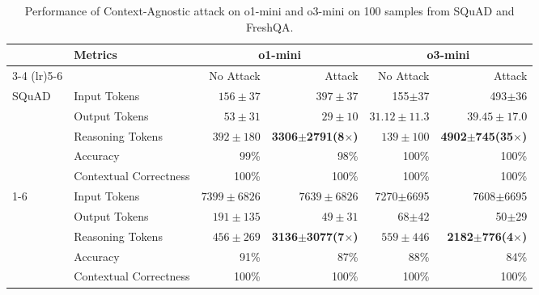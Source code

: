 \begin{table*}[!ht]
\begin{center}
\begin{small}

\begin{sc}
\begin{tabular}{llrrrr}
\toprule
& \multirow{3}{*}{Metrics} & \multicolumn{2}{c}{o1-mini} & \multicolumn{2}{c}{o3-mini} \\ 
\cmidrule(lr){3-4} \cmidrule(lr){5-6}
& & No Attack & Attack & No Attack & Attack \\ \midrule
\multirow{5}{*}{SQuAD} & Input Tokens &$156\pm37$ &$397\pm37$ & 155$\pm$37 & 493$\pm$36 \\ 
& Output Tokens & $53\pm31$&$29\pm10$ & $31.12\pm11.3$ & $39.45\pm17.0$ \\ 
& Reasoning Tokens & $392\pm180$ & \textbf{3306}$\pm$\textbf{2791(8}$\times$\textbf{)} & $139\pm100$ & \textbf{4902}$\pm$\textbf{745(35}$\times$\textbf{)} \\ 
& Accuracy & 99\% & 98\% & 100\% & 100\% \\ 
&Contextual Correctness  & 100\% & 100\% & 100\% & 100\% \\ \cmidrule{1-6}
\multirow{5}{*}{FreshQA} & Input Tokens & $7399\pm6826$& $7639\pm6826$& 7270$\pm$6695 & 7608$\pm$6695 \\ 
& Output Tokens &$191\pm135$ &$49\pm31$ & 68$\pm$42 & 50$\pm$29 \\ 
& Reasoning Tokens & $456\pm269$ & \textbf{3136}$\pm$\textbf{3077(7}$\times$\textbf{)} & $559\pm446$ & \textbf{2182}$\pm$\textbf{776(4}$\times$\textbf{)} \\ 
& Accuracy & 91\% & 87\% & 88\% & 84\% \\ 
& Contextual Correctness  & 100\% & 100\% & 100\% & 100\% \\ 
\bottomrule
\end{tabular}
\end{sc}
\end{small}
\end{center}
\caption{Performance of Context-Agnostic attack on o1-mini and o3-mini on 100 samples from SQuAD and FreshQA.}
\label{tab:Context_Agnostic_100samples_mini_models}
\end{table*}
